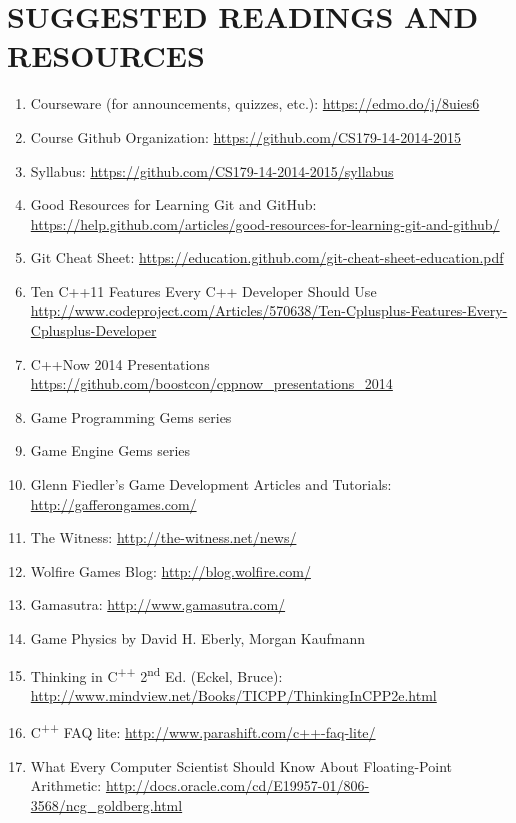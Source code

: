 \documentclass[10pt]{article}
\begin{document}
\section{SUGGESTED READINGS AND RESOURCES}
\begin{enumerate}[noitemsep]
\item Courseware (for announcements, quizzes, etc.): \url{https://edmo.do/j/8uies6}
\item Course Github Organization: \url{https://github.com/CS179-14-2014-2015}
\item Syllabus: \url{https://github.com/CS179-14-2014-2015/syllabus}
\item Good Resources for Learning Git and GitHub: \\\url{https://help.github.com/articles/good-resources-for-learning-git-and-github/}
\item Git Cheat Sheet: \url{https://education.github.com/git-cheat-sheet-education.pdf}
\item Ten C++11 Features Every C++ Developer Should Use \\\url{http://www.codeproject.com/Articles/570638/Ten-Cplusplus-Features-Every-Cplusplus-Developer}
\item C++Now 2014 Presentations \url{https://github.com/boostcon/cppnow_presentations_2014}
\item Game Programming Gems series
\item Game Engine Gems series
\item Glenn Fiedler's Game Development Articles and Tutorials: \url{http://gafferongames.com/}
\item The Witness: \url{http://the-witness.net/news/}
\item Wolfire Games Blog: \url{http://blog.wolfire.com/}
\item Gamasutra: \url{http://www.gamasutra.com/}
\item Game Physics by David H. Eberly, Morgan Kaufmann
\item Thinking in C\textsuperscript{++} 2\textsuperscript{nd} Ed. (Eckel, Bruce): \\\url{http://www.mindview.net/Books/TICPP/ThinkingInCPP2e.html}
\item C\textsuperscript{++} FAQ lite: \url{http://www.parashift.com/c++-faq-lite/}
\item What Every Computer Scientist Should Know About Floating-Point Arithmetic: \url{http://docs.oracle.com/cd/E19957-01/806-3568/ncg_goldberg.html}
\end{enumerate}
\end{document}
